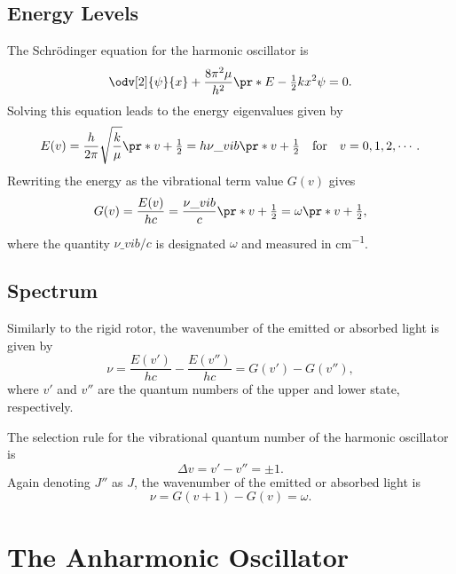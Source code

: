 \documentclass[11pt, twoside, fleqn]{report}
\begin{document}
\section{Energy Levels}
\label{s:energy_levels_2}

The Schr\"odinger equation for the harmonic oscillator is
\begin{equation*}
    \odv[2]{\psi}{x} + \frac{8\pi^2\mu}{h^2}\pr*{E - \tfrac{1}{2}kx^2}\psi = 0.
\end{equation*}
Solving this equation leads to the energy eigenvalues given by
\begin{equation*}
    E(v) = \frac{h}{2\pi}\sqrt{\frac{k}{\mu}}\pr*{v + \tfrac{1}{2}} = h\nu\_{vib}\pr*{v + \tfrac{1}{2}} \quad\text{for}\quad v = 0, 1, 2, \dotsb.
\end{equation*}
Rewriting the energy as the vibrational term value $G(v)$ gives
\begin{equation*}
    G(v) = \frac{E(v)}{hc} = \frac{\nu\_{vib}}{c}\pr*{v + \tfrac{1}{2}} = \omega\pr*{v + \tfrac{1}{2}},
\end{equation*}
where the quantity $\nu\_{vib}/c$ is designated $\omega$ and measured in \unit{cm^{-1}}.

\section{Spectrum}
\label{s:spectrum_2}

Similarly to the rigid rotor, the wavenumber of the emitted or absorbed light is given by
\begin{equation*}
    \nu = \frac{E(v')}{hc} - \frac{E(v'')}{hc} = G(v') - G(v''),
\end{equation*}
where $v'$ and $v''$ are the quantum numbers of the upper and lower state, respectively.

The selection rule for the vibrational quantum number of the harmonic oscillator is
\begin{equation*}
    \Delta{}v = v' - v'' = \pm 1.
\end{equation*}
Again denoting $J''$ as $J$, the wavenumber of the emitted or absorbed light is
\begin{equation*}
    \nu = G(v + 1) - G(v) = \omega.
\end{equation*}

\chapter{The Anharmonic Oscillator}
\label{c:the_anharmonic_oscillator}
\end{document}
